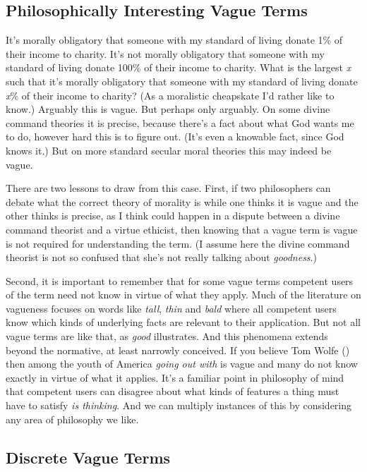 \documentclass[
  11pt,
  letterpaper,
  DIV=11,
  numbers=noendperiod,
  twoside]{scrartcl}
\begin{document}
\subsection{Philosophically Interesting Vague
Terms}\label{philosophically-interesting-vague-terms}

It's morally obligatory that someone with my standard of living donate
1\% of their income to charity. It's not morally obligatory that someone
with my standard of living donate 100\% of their income to charity. What
is the largest \emph{x} such that it's morally obligatory that someone
with my standard of living donate \emph{x}\% of their income to charity?
(As a moralistic cheapskate I'd rather like to know.) Arguably this is
vague. But perhaps only arguably. On some divine command theories it is
precise, because there's a fact about what God wants me to do, however
hard this is to figure out. (It's even a knowable fact, since God knows
it.) But on more standard secular moral theories this may indeed be
vague.

There are two lessons to draw from this case. First, if two philosophers
can debate what the correct theory of morality is while one thinks it is
vague and the other thinks is precise, as I think could happen in a
dispute between a divine command theorist and a virtue ethicist, then
knowing that a vague term is vague is not required for understanding the
term. (I assume here the divine command theorist is not so confused that
she's not really talking about \emph{goodness}.)

Second, it is important to remember that for some vague terms competent
users of the term need not know in virtue of what they apply. Much of
the literature on vagueness focuses on words like \emph{tall},
\emph{thin} and \emph{bald} where all competent users know which kinds
of underlying facts are relevant to their application. But not all vague
terms are like that, as \emph{good} illustrates. And this phenomena
extends beyond the normative, at least narrowly conceived. If you
believe Tom Wolfe () then among the youth
of America \emph{going out with} is vague and many do not know exactly
in virtue of what it applies. It's a familiar point in philosophy of
mind that competent users can disagree about what kinds of features a
thing must have to satisfy \emph{is thinking}. And we can multiply
instances of this by considering any area of philosophy we like.

\subsection{Discrete Vague Terms}\label{discrete-vague-terms}
\end{document}
